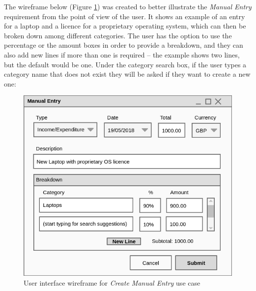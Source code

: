 The wireframe below (Figure \ref{fig:Wireframe.CreateManualEntry}) was created
to better illustrate the \emph{Manual Entry} requirement from the point of view
of the user. It shows an example of an entry for a laptop and a licence for a
proprietary operating system, which can then be broken down among different
categories. The user has the option to use the percentage or the amount boxes
in order to provide a breakdown, and they can also add new lines if more than
one is required -- the example shows two lines, but the default would be one.
Under the category search box, if the user types a category name that does not
exist they will be asked if they want to create a new one:
\begin{figure}[ht!]
  \begin{center}
    \includegraphics[width=14cm]{./contents/img/Wireframe_-_Manual_Entry.png}
  \end{center}
  \caption{User interface wireframe for \emph{Create Manual Entry} use case}
  \label{fig:Wireframe.CreateManualEntry}
\end{figure}
\FloatBarrier

